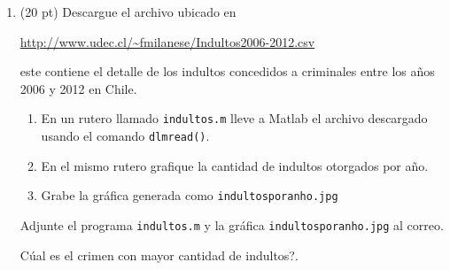 \documentclass[11pt]{article}
\begin{document}
\begin{enumerate}
\item (20 pt) Descargue el archivo ubicado en 
\begin{center}
\url{http://www.udec.cl/~fmilanese/Indultos2006-2012.csv}
\end{center}
este contiene el detalle de los indultos concedidos a criminales entre los a\~nos 2006 y 2012 en Chile. 
\begin{enumerate}
	\item En un rutero llamado \texttt{indultos.m} lleve a Matlab el archivo descargado usando el comando \texttt{dlmread()}. 
    \item En el mismo rutero grafique la cantidad de indultos otorgados por a\~no.
    \item Grabe la gr\'afica generada como \texttt{indultosporanho.jpg}
\end{enumerate}
Adjunte el programa \texttt{indultos.m} y la gr\'afica \texttt{indultosporanho.jpg} al correo.

\textquestiondown C\'ual es el crimen con mayor cantidad de indultos?.

\fbox{ \begin{minipage}{\textwidth}  

\hfill\vspace{1cm} 
\end{minipage} } 


\end{enumerate}
\end{document}
